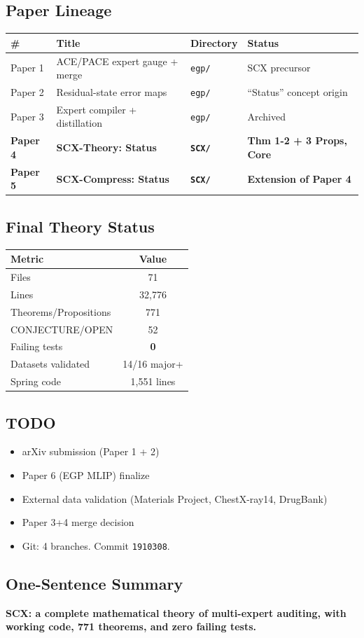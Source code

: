 \documentclass[12pt]{article}
\begin{document}
\subsection{Paper Lineage}
\begin{longtable}{@{}p{} p{} p{} p{}@{}}
\toprule \# & Title & Directory & Status \\
\midrule
Paper 1 & ACE/PACE expert gauge + merge & \texttt{egp/} & SCX precursor \\
Paper 2 & Residual-state error maps & \texttt{egp/} & ``Status'' concept origin \\
Paper 3 & Expert compiler + distillation & \texttt{egp/} & Archived \\
\textbf{Paper 4} & \textbf{SCX-Theory: Status} & \textbf{\texttt{SCX/}} & \textbf{Thm 1-2 + 3 Props, Core} \\
\textbf{Paper 5} & \textbf{SCX-Compress: Status} & \textbf{\texttt{SCX/}} & \textbf{Extension of Paper 4} \\
\bottomrule
\end{longtable}

\subsection{Final Theory Status}
\begin{longtable}{@{}lc@{}}
\toprule Metric & Value \\
\midrule
Files & 71 \\
Lines & 32,776 \\
Theorems/Propositions & 771 \\
CONJECTURE/OPEN & 52 \\
Failing tests & \textbf{0} \\
Datasets validated & 14/16 major+ \\
Spring code & 1,551 lines \\
\bottomrule
\end{longtable}

\subsection{TODO}
\begin{itemize}
\item[\(\square\)] arXiv submission (Paper 1 + 2)
\item[\(\square\)] Paper 6 (EGP MLIP) finalize
\item[\(\square\)] External data validation (Materials Project, ChestX-ray14, DrugBank)
\item[\(\square\)] Paper 3+4 merge decision
\item[\(\square\)] Git: 4 branches. Commit \texttt{1910308}.
\end{itemize}

\subsection{One-Sentence Summary}
\textbf{SCX: a complete mathematical theory of multi-expert auditing, with working code, 771 theorems, and zero failing tests.}
\end{document}
